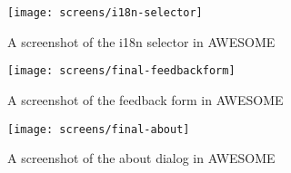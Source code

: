 	\begin{figure}[H]
		\centering \texttt{[image: screens/i18n-selector]}
		\caption{A screenshot of the \ac{i18n} selector in \acs{AWESOME}}
		\label{fig:i18nselector}
	\end{figure}
	
	\begin{figure}[H]
		\texttt{[image: screens/final-feedbackform]}
		\caption{A screenshot of the feedback form in \acs{AWESOME}}
		\label{fig:feedbackform}
	\end{figure}
	
	\begin{figure}[H]
		\texttt{[image: screens/final-about]}
		\caption{A screenshot of the about dialog in \acs{AWESOME}}
		\label{fig:aboutpage}
	\end{figure}